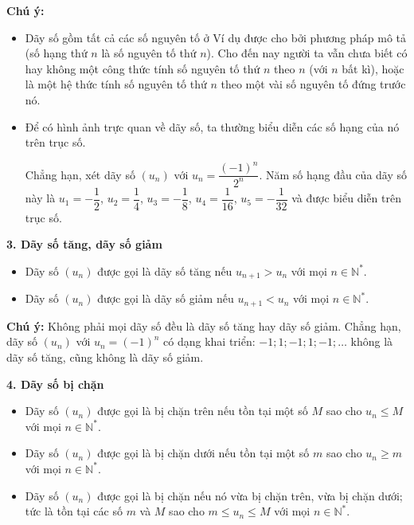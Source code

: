 \documentclass[12pt,a4paper]{extarticle}
\begin{document}
\vspace{0.3cm}
\noindent\textbf{Chú ý:}
\begin{itemize}
    \item Dãy số gồm tất cả các số nguyên tố ở Ví dụ được cho bởi phương pháp mô tả (số hạng thứ $n$ là số nguyên tố thứ $n$). Cho đến nay người ta vẫn chưa biết có hay không một công thức tính số nguyên tố thứ $n$ theo $n$ (với $n$ bất kì), hoặc là một hệ thức tính số nguyên tố thứ $n$ theo một vài số nguyên tố đứng trước nó.
    \item Để có hình ảnh trực quan về dãy số, ta thường biểu diễn các số hạng của nó trên trục số.
    
    Chẳng hạn, xét dãy số $(u_n)$ với $u_n = \dfrac{(-1)^n}{2^n}$. Năm số hạng đầu của dãy số này là $u_1 = -\dfrac{1}{2}$, $u_2 = \dfrac{1}{4}$, $u_3 = -\dfrac{1}{8}$, $u_4 = \dfrac{1}{16}$, $u_5 = -\dfrac{1}{32}$ và được biểu diễn trên trục số.
\end{itemize}
\vspace{0.4cm}

\noindent\textbf{3. Dãy số tăng, dãy số giảm}
\begin{itemize}
    \item Dãy số $(u_n)$ được gọi là dãy số tăng nếu $u_{n+1} > u_n$ với mọi $n \in \mathbb{N}^*$.
    \item Dãy số $(u_n)$ được gọi là dãy số giảm nếu $u_{n+1} < u_n$ với mọi $n \in \mathbb{N}^*$.
\end{itemize}
\noindent\textbf{Chú ý:} Không phải mọi dãy số đều là dãy số tăng hay dãy số giảm. Chẳng hạn, dãy số $(u_n)$ với $u_n = (-1)^n$ có dạng khai triển: $-1; 1; -1; 1; -1; \dots$ không là dãy số tăng, cũng không là dãy số giảm.
\vspace{0.3cm}

\vspace{0.4cm}
\noindent\textbf{4. Dãy số bị chặn}
\begin{itemize}
    \item Dãy số $(u_n)$ được gọi là bị chặn trên nếu tồn tại một số $M$ sao cho $u_n \le M$ với mọi $n \in \mathbb{N}^*$.
    \item Dãy số $(u_n)$ được gọi là bị chặn dưới nếu tồn tại một số $m$ sao cho $u_n \ge m$ với mọi $n \in \mathbb{N}^*$.
    \item Dãy số $(u_n)$ được gọi là bị chặn nếu nó vừa bị chặn trên, vừa bị chặn dưới; tức là tồn tại các số $m$ và $M$ sao cho $m \le u_n \le M$ với mọi $n \in \mathbb{N}^*$.
\end{itemize}
\vspace{0.3cm}
\end{document}

